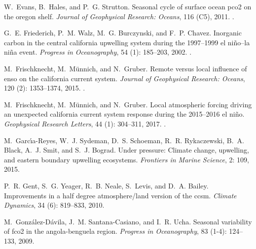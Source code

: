 \documentclass[hvmath, online,bgd]{copernicus_discussions}
\begin{document}
\begin{thebibliography}{84}
	W.~Evans, B.~Hales, and P.~G. Strutton.
	\newblock Seasonal cycle of surface ocean pco2 on the oregon shelf.
	\newblock \emph{Journal of Geophysical Research: Oceans}, 116 (C5),
	2011.
	\newblock {}.
	
	G.~E. Friederich, P.~M. Walz, M.~G. Burczynski, and F.~P. Chavez.
	\newblock Inorganic carbon in the central california upwelling system during
	the 1997--1999 el ni{\~n}o--la ni{\~n}a event.
	\newblock \emph{Progress in Oceanography}, 54 (1): 185--203,
	2002.
	\newblock {}.
	
	M.~Frischknecht, M.~M{\"u}nnich, and N.~Gruber.
	\newblock Remote versus local influence of enso on the california current
	system.
	\newblock \emph{Journal of Geophysical Research: Oceans}, 120
	(2): 1353--1374, 2015.
	\newblock {}.
	
	M.~Frischknecht, M.~M{\"u}nnich, and N.~Gruber.
	\newblock Local atmospheric forcing driving an unexpected california current
	system response during the 2015--2016 el ni{\~n}o.
	\newblock \emph{Geophysical Research Letters}, 44 (1):
	304--311, 2017.
	\newblock {}.
	
	M.~Garc{\'\i}a-Reyes, W.~J. Sydeman, D.~S. Schoeman, R.~R. Rykaczewski, B.~A.
	Black, A.~J. Smit, and S.~J. Bograd.
	\newblock Under pressure: Climate change, upwelling, and eastern boundary
	upwelling ecosystems.
	\newblock \emph{Frontiers in Marine Science}, 2: 109, 2015.
	
	P.~R. Gent, S.~G. Yeager, R.~B. Neale, S.~Levis, and D.~A. Bailey.
	\newblock Improvements in a half degree atmosphere/land version of the ccsm.
	\newblock \emph{Climate Dynamics}, 34 (6): 819--833, 2010.
	
	M.~Gonz{\'a}lez-D{\'a}vila, J.~M. Santana-Casiano, and I.~R. Ucha.
	\newblock Seasonal variability of fco2 in the angola-benguela region.
	\newblock \emph{Progress in Oceanography}, 83 (1-4):
	124--133, 2009.
	

\end{thebibliography}
\end{document}

